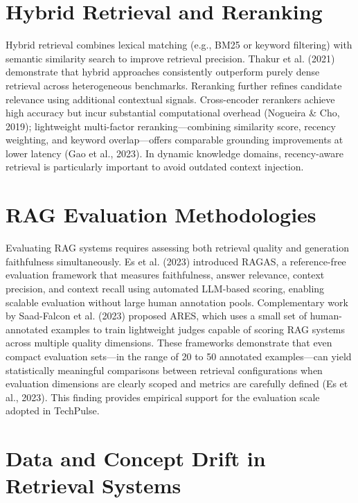 \documentclass[12pt,a4paper]{report}
\begin{document}
\section{Hybrid Retrieval and Reranking}
\label{sec:lit_hybrid}

Hybrid retrieval combines lexical matching (e.g., BM25 or keyword filtering) with semantic similarity search to improve retrieval precision. Thakur et al. (2021) demonstrate that hybrid approaches consistently outperform purely dense retrieval across heterogeneous benchmarks. Reranking further refines candidate relevance using additional contextual signals. Cross-encoder rerankers achieve high accuracy but incur substantial computational overhead (Nogueira \& Cho, 2019); lightweight multi-factor reranking—combining similarity score, recency weighting, and keyword overlap—offers comparable grounding improvements at lower latency (Gao et al., 2023). In dynamic knowledge domains, recency-aware retrieval is particularly important to avoid outdated context injection.

\section{RAG Evaluation Methodologies}
\label{sec:lit_eval}

Evaluating RAG systems requires assessing both retrieval quality and generation faithfulness simultaneously. Es et al. (2023) introduced RAGAS, a reference-free evaluation framework that measures faithfulness, answer relevance, context precision, and context recall using automated LLM-based scoring, enabling scalable evaluation without large human annotation pools. Complementary work by Saad-Falcon et al. (2023) proposed ARES, which uses a small set of human-annotated examples to train lightweight judges capable of scoring RAG systems across multiple quality dimensions. These frameworks demonstrate that even compact evaluation sets—in the range of 20 to 50 annotated examples—can yield statistically meaningful comparisons between retrieval configurations when evaluation dimensions are clearly scoped and metrics are carefully defined (Es et al., 2023). This finding provides empirical support for the evaluation scale adopted in TechPulse.

\section{Data and Concept Drift in Retrieval Systems}
\label{sec:lit_drift}
\end{document}
